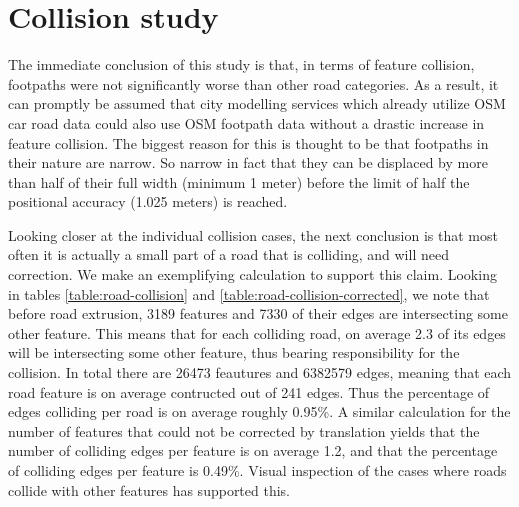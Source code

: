 \documentclass{kththesis}
\begin{document}




\section{Collision study}

The immediate conclusion of this study is that, in terms of feature collision, footpaths were not significantly worse than other road categories.
As a result, it can promptly be assumed that city modelling services which already utilize OSM car road data could also use OSM footpath data without a drastic increase in feature collision.
The biggest reason for this is thought to be that footpaths in their nature are narrow.
So narrow in fact that they can be displaced by more than half of their full width (minimum 1 meter) before the limit of half the positional accuracy (1.025 meters) is reached.

Looking closer at the individual collision cases, the next conclusion is that most often it is actually a small part of a road that is colliding, and will need correction.
We make an exemplifying calculation to support this claim.
Looking in tables \ref{table:road-collision} and \ref{table:road-collision-corrected}, we note that before road extrusion, 3189 features and 7330 of their edges are intersecting some other feature.
This means that for each colliding road, on average 2.3 of its edges will be intersecting some other feature, thus bearing responsibility for the collision.
In total there are 26473 feautures and 6382579 edges, meaning that each road feature is on average contructed out of 241 edges.
Thus the percentage of edges colliding per road is on average roughly 0.95\%.
A similar calculation for the number of features that could not be corrected by translation yields that the number of colliding edges per feature is on average 1.2, and that the percentage of colliding edges per feature is 0.49\%.
Visual inspection of the cases where roads collide with other features has supported this.
\end{document}
